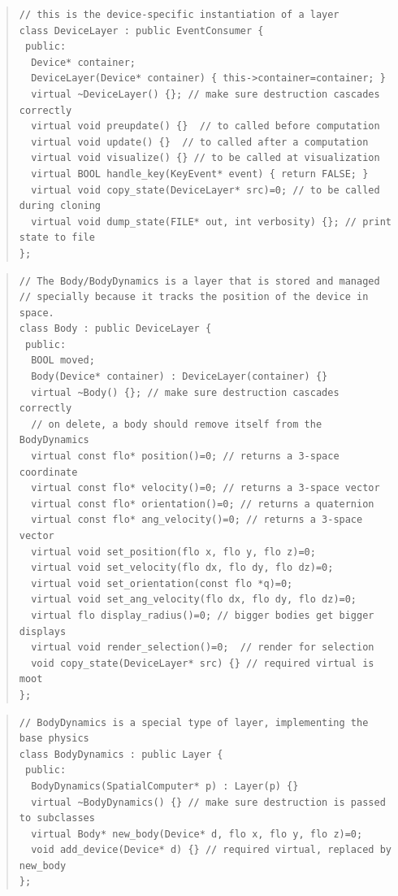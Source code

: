 \documentclass{article}
\begin{document}
\begin{quote}
\begin{verbatim}
// this is the device-specific instantiation of a layer
class DeviceLayer : public EventConsumer {
 public:
  Device* container;
  DeviceLayer(Device* container) { this->container=container; }
  virtual ~DeviceLayer() {}; // make sure destruction cascades correctly
  virtual void preupdate() {}  // to called before computation
  virtual void update() {}  // to called after a computation
  virtual void visualize() {} // to be called at visualization
  virtual BOOL handle_key(KeyEvent* event) { return FALSE; }
  virtual void copy_state(DeviceLayer* src)=0; // to be called during cloning
  virtual void dump_state(FILE* out, int verbosity) {}; // print state to file
};
\end{verbatim}
\end{quote}

\begin{quote}
\begin{verbatim}
// The Body/BodyDynamics is a layer that is stored and managed
// specially because it tracks the position of the device in space.
class Body : public DeviceLayer {
 public:
  BOOL moved;
  Body(Device* container) : DeviceLayer(container) {}
  virtual ~Body() {}; // make sure destruction cascades correctly
  // on delete, a body should remove itself from the BodyDynamics
  virtual const flo* position()=0; // returns a 3-space coordinate
  virtual const flo* velocity()=0; // returns a 3-space vector
  virtual const flo* orientation()=0; // returns a quaternion
  virtual const flo* ang_velocity()=0; // returns a 3-space vector
  virtual void set_position(flo x, flo y, flo z)=0;
  virtual void set_velocity(flo dx, flo dy, flo dz)=0;
  virtual void set_orientation(const flo *q)=0;
  virtual void set_ang_velocity(flo dx, flo dy, flo dz)=0;
  virtual flo display_radius()=0; // bigger bodies get bigger displays
  virtual void render_selection()=0;  // render for selection
  void copy_state(DeviceLayer* src) {} // required virtual is moot
};
\end{verbatim}
\end{quote}

\begin{quote}
\begin{verbatim}
// BodyDynamics is a special type of layer, implementing the base physics
class BodyDynamics : public Layer {
 public:
  BodyDynamics(SpatialComputer* p) : Layer(p) {}
  virtual ~BodyDynamics() {} // make sure destruction is passed to subclasses
  virtual Body* new_body(Device* d, flo x, flo y, flo z)=0;
  void add_device(Device* d) {} // required virtual, replaced by new_body
};
\end{verbatim}
\end{quote}
\end{document}
